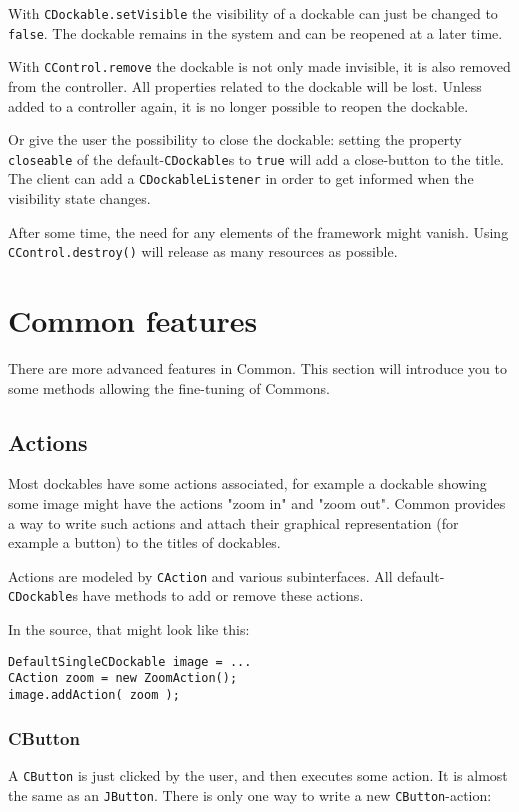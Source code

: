 \documentclass[a4paper,10pt]{article}
\newcommand{\src}[1]{\lstinline[basicstyle=\ttfamily]|#1|}
\begin{document}
With \src{CDockable.setVisible} the visibility of a dockable can just be changed to \src{false}. The dockable remains in the system and can be reopened at a later time.

With \src{CControl.remove} the dockable is not only made invisible, it is also removed from the controller. All properties related to the dockable will be lost. Unless added to a controller again, it is no longer possible to reopen the dockable.

Or give the user the possibility to close the dockable: setting the property \src{closeable} of the default-\src{CDockable}s to \src{true} will add a close-button to the title. The client can add a \src{CDockableListener} in order to get informed when the visibility state changes.

After some time, the need for any elements of the framework might vanish. Using \src{CControl.destroy()} will release as many resources as possible.

\section{Common features}
There are more advanced features in Common. This section will introduce you to some methods allowing the fine-tuning of Commons.

\subsection{Actions}
Most dockables have some actions associated, for example a dockable showing some image might have the actions "zoom in" and "zoom out". Common provides a way to write such actions and attach their graphical representation (for example a button) to the titles of dockables. 

Actions are modeled by \src{CAction} and various subinterfaces. All default-\src{CDockable}s have methods to add or remove these actions.

In the source, that might look like this:
\begin{lstlisting}
DefaultSingleCDockable image = ...
CAction zoom = new ZoomAction();
image.addAction( zoom );
\end{lstlisting}

\subsubsection{CButton}
A \src{CButton} is just clicked by the user, and then executes some action. It is almost the same as an \src{JButton}. There is only one way to write a new \src{CButton}-action:
\end{document}
